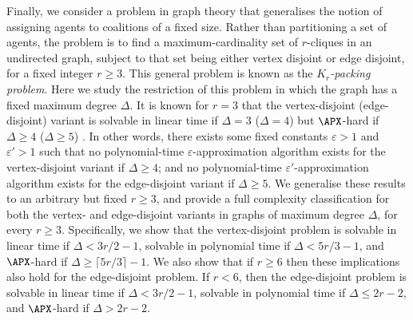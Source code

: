 Finally, we consider a problem in graph theory that generalises the notion of assigning agents to coalitions of a fixed size. Rather than partitioning a set of agents, the problem is to find a maximum-cardinality set of $r$-cliques in an undirected graph, subject to that set being either vertex disjoint or edge disjoint, for a fixed integer $r \geq 3$. This general problem is known as the \emph{$K_r$-packing problem}. Here we study the restriction of this problem in which the graph has a fixed maximum degree $\Delta$. It is known for $r=3$ that the vertex-disjoint (edge-disjoint) variant is solvable in linear time if $\Delta=3$ ($\Delta=4$) but $\APX$-hard if $\Delta \geq 4$ ($\Delta \geq 5$) \cite{caprara_packing_2002}. In other words, there exists some fixed constants $\varepsilon > 1$ and $\varepsilon' > 1$ such that no polynomial-time $\varepsilon$-approximation algorithm exists for the vertex-disjoint variant if $\Delta \geq 4$; and no polynomial-time $\varepsilon'$-approximation algorithm exists for the edge-disjoint variant if $\Delta \geq 5$. We generalise these results to an arbitrary but fixed $r \geq 3$, and provide a full complexity classification for both the vertex- and edge-disjoint variants in graphs of maximum degree $\Delta$, for every $r \geq 3$. Specifically, we show that the vertex-disjoint problem is solvable in linear time if $\Delta < 3r/2 - 1$, solvable in polynomial time if $\Delta < 5r/3 - 1$, and $\APX$-hard if $\Delta \geq \lceil 5r/3 \rceil - 1$. We also show that if $r\geq 6$ then these implications also hold for the edge-disjoint problem. If $r < 6$, then the edge-disjoint problem is solvable in linear time if $\Delta < 3r/2 - 1$, solvable in polynomial time if $\Delta \leq 2r - 2$, and $\APX$-hard if $\Delta > 2r - 2$.
